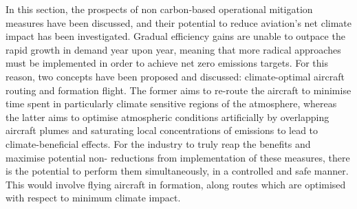 In this section, the prospects of non carbon-based operational mitigation measures have been discussed, and their potential to reduce aviation's net climate impact has been investigated. Gradual efficiency gains are unable to outpace the rapid growth in demand year upon year, meaning that more radical approaches must be implemented in order to achieve net zero emissions targets. For this reason, two concepts have been proposed and discussed: climate-optimal aircraft routing and formation flight. The former aims to re-route the aircraft to minimise time spent in particularly climate sensitive regions of the atmosphere, whereas the latter aims to optimise atmospheric conditions artificially by overlapping aircraft plumes and saturating local concentrations of emissions to lead to climate-beneficial effects. For the industry to truly reap the benefits and maximise potential non- reductions from implementation of these measures, there is the potential to perform them simultaneously, in a controlled and safe manner. This would involve flying aircraft in formation, along routes which are optimised with respect to minimum climate impact.  







